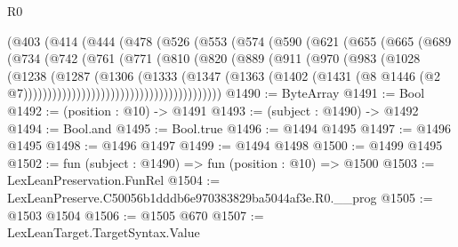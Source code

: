 \begin{lexlean}{R0}
\begin{coremodule}
                    (@403
                      (@414
                        (@444
                          (@478
                            (@526
                              (@553
                                (@574
                                  (@590
                                    (@621
                                      (@655
                                        (@665
                                          (@689
                                            (@734
                                              (@742
                                                (@761
                                                  (@771
                                                    (@810
                                                      (@820
                                                        (@889
                                                          (@911
                                                            (@970
                                                              (@983
                                                                (@1028
                                                                  (@1238
                                                                    (@1287
                                                                      (@1306
                                                                        (@1333
                                                                          (@1347
                                                                            (@1363
                                                                              (@1402
                                                                                (@1431
                                                                                  (@8
                                                                                    @1446
                                                                                    (@2
                                                                                      @7)))))))))))))))))))))))))))))))))))))))))
@1490 := ByteArray
@1491 := Bool
@1492 := (position : @10) -> @1491
@1493 := (subject : @1490) -> @1492
@1494 := Bool.and
@1495 := Bool.true
@1496 := @1494 @1495
@1497 := @1496 @1495
@1498 := @1496 @1497
@1499 := @1494 @1498
@1500 := @1499 @1495
@1502 := fun (subject : @1490) => fun (position : @10) => @1500
@1503 := LexLeanPreservation.FunRel
@1504 := LexLeanPreserve.C50056b1dddb6e970383829ba5044af3e.R0.__prog
@1505 := @1503 @1504
@1506 := @1505 @670
@1507 := LexLeanTarget.TargetSyntax.Value

\end{coremodule}
\end{lexlean}
